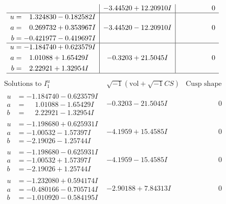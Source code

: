 \documentclass[1p]{elsarticle_modified}
\theoremstyle{definition}
\newcommand{\I}{\sqrt{-1}}
\begin{document}
$$\begin{array}{c|c|c}
 & -3.44520 + 12.20910 I & \phantom{-0.000000 } 0 \\ \hline\begin{aligned}
u &= \phantom{-}1.324830 - 0.182582 I \\
a &= \phantom{-}0.269732 + 0.353967 I \\
b &= -0.421977 - 0.419697 I\end{aligned}
 & -3.44520 - 12.20910 I & \phantom{-0.000000 } 0 \\ \hline\begin{aligned}
u &= -1.184740 + 0.623579 I \\
a &= \phantom{-}1.01088 + 1.65429 I \\
b &= \phantom{-}2.22921 + 1.32954 I\end{aligned}
 & -0.3203 + 21.5045 I & \phantom{-0.000000 } 0\\
 \hline 
 \end{array}$$\newpage$$\begin{array}{c|c|c}  
\text{Solutions to }I^u_{1}& \I (\text{vol} + \sqrt{-1}CS) & \text{Cusp shape}\\
 \hline 
\begin{aligned}
u &= -1.184740 - 0.623579 I \\
a &= \phantom{-}1.01088 - 1.65429 I \\
b &= \phantom{-}2.22921 - 1.32954 I\end{aligned}
 & -0.3203 - 21.5045 I & \phantom{-0.000000 } 0 \\ \hline\begin{aligned}
u &= -1.198680 + 0.625931 I \\
a &= -1.00532 - 1.57397 I \\
b &= -2.19026 - 1.25744 I\end{aligned}
 & -4.1959 + 15.4585 I & \phantom{-0.000000 } 0 \\ \hline\begin{aligned}
u &= -1.198680 - 0.625931 I \\
a &= -1.00532 + 1.57397 I \\
b &= -2.19026 + 1.25744 I\end{aligned}
 & -4.1959 - 15.4585 I & \phantom{-0.000000 } 0 \\ \hline\begin{aligned}
u &= -1.232080 + 0.594174 I \\
a &= -0.480166 - 0.705714 I \\
b &= -1.010920 - 0.584195 I\end{aligned}
 & -2.90188 + 7.84313 I & \phantom{-0.000000 } 0 \\ \hline\begin{aligned}

\end{aligned}
\end{array}$$
\end{document}
